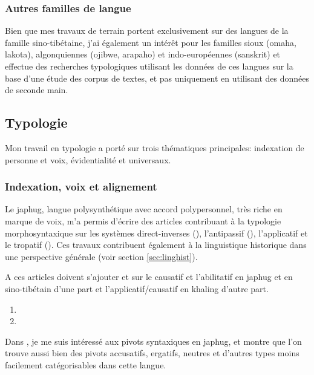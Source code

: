 \documentclass[oldfontcommands,oneside,a4paper,11pt]{article}
\begin{document}
\subsubsection{Autres familles de langue}
Bien que mes travaux de terrain portent exclusivement sur des langues de la famille sino-tibétaine, j'ai également un intérêt pour les familles sioux (omaha, lakota), algonquiennes (ojibwe, arapaho) et indo-européennes (sanskrit)  et effectue des recherches typologiques utilisant les données de ces langues sur la base d'une étude des corpus de textes, et pas uniquement en utilisant des données de seconde main.

\subsection{Typologie} \label{sec:typologie}

Mon travail en typologie a porté sur trois thématiques principales: indexation de personne et voix, évidentialité et universaux.

\subsubsection{Indexation, voix et alignement}
Le japhug, langue polysynthétique avec accord polypersonnel, très riche en marque de voix, m'a permis d'écrire des articles contribuant à la typologie morphosyntaxique sur les systèmes direct-inverses (\citealt{jacques14inverse}), l'antipassif (\citealt{jacques14antipassive}), l'applicatif et le tropatif (\citealt{jacques13tropative}). Ces travaux contribuent également à la linguistique historique dans une perspective générale (voir section  \ref{sec:linghist}).

A ces articles doivent s'ajouter \citet{jacques15causative} et  \citet{jacques15derivational.khaling} sur le causatif et l'abilitatif en japhug et en sino-tibétain d'une part et l'applicatif/causatif en khaling d'autre part.

\begin{enumerate}
\item  {}
\item  {}
\end{enumerate} 

Dans \citet{jacques16relatives}, je me suis intéressé aux pivots syntaxiques en japhug, et montre que l'on trouve aussi bien des pivots accusatifs, ergatifs, neutres et d'autres types moins facilement catégorisables dans cette langue.
\end{document}
